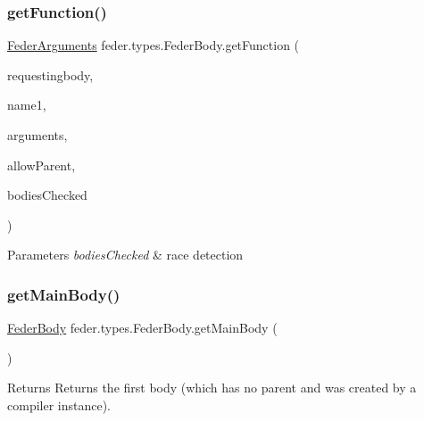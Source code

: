 \subsubsection{\texorpdfstring{get\+Function()}{getFunction()}\hspace{0.1cm}{\footnotesize\ttfamily [2/2]}}
{\footnotesize\ttfamily \hyperlink{interfacefeder_1_1types_1_1FederArguments}{Feder\+Arguments} feder.\+types.\+Feder\+Body.\+get\+Function (\begin{DoxyParamCaption}\item[{\hyperlink{classfeder_1_1types_1_1FederBody}{Feder\+Body}}]{requestingbody,  }\item[{String}]{name1,  }\item[{List$<$ \hyperlink{classfeder_1_1types_1_1FederBinding}{Feder\+Binding} $>$}]{arguments,  }\item[{boolean}]{allow\+Parent,  }\item[{List$<$ \hyperlink{classfeder_1_1types_1_1FederBody}{Feder\+Body} $>$}]{bodies\+Checked }\end{DoxyParamCaption})\hspace{0.3cm}{\ttfamily [protected]}}


\begin{DoxyParams}{Parameters}
{\em bodies\+Checked} & race detection \\
\hline
\end{DoxyParams}
\mbox{\label{classfeder_1_1types_1_1FederBody_ac69fba3b468b2f0ab66d7a87cc501da6}} 
\subsubsection{\texorpdfstring{get\+Main\+Body()}{getMainBody()}}
{\footnotesize\ttfamily \hyperlink{classfeder_1_1types_1_1FederBody}{Feder\+Body} feder.\+types.\+Feder\+Body.\+get\+Main\+Body (\begin{DoxyParamCaption}{ }\end{DoxyParamCaption})}

\begin{DoxyReturn}{Returns}
Returns the \textquotesingle{}first\textquotesingle{} body (which has no parent and was created by a compiler instance). 
\end{DoxyReturn}
\mbox{\label{classfeder_1_1types_1_1FederBody_a88b8e80235ad8b5b8dc92e7e2e9daaca}} 
